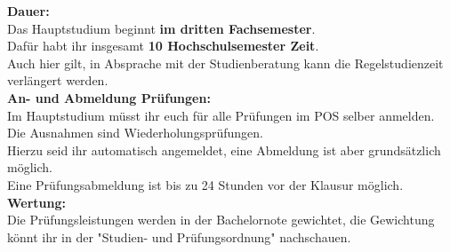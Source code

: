 \textbf{Dauer:}\\
Das Hauptstudium beginnt \textbf{im dritten Fachsemester}.\\
Dafür habt ihr insgesamt \textbf{10 Hochschulsemester Zeit}.\\
Auch hier gilt, in Absprache mit der Studienberatung kann die Regelstudienzeit verlängert werden.\\

\textbf{An- und Abmeldung Prüfungen:}\\
Im Hauptstudium müsst ihr euch für alle Prüfungen im POS selber anmelden.\\
Die Ausnahmen sind Wiederholungsprüfungen.\\
Hierzu seid ihr automatisch angemeldet, eine Abmeldung ist aber grundsätzlich möglich.\\ %
Eine Prüfungsabmeldung ist bis zu 24 Stunden vor der Klausur möglich.\\

\textbf{Wertung:}\\
Die Prüfungsleistungen werden in der Bachelornote gewichtet, die Gewichtung könnt ihr in der "Studien- und Prüfungsordnung" nachschauen.\\
